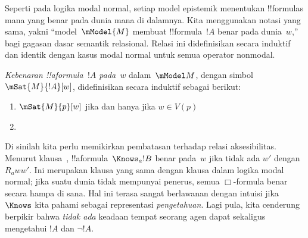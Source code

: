 \documentclass[../../../include/open-logic-section]{subfiles}
\begin{document}


Seperti pada logika modal normal, setiap model epistemik menentukan
!!{formula}s mana yang benar pada dunia mana di dalamnya. Kita menggunakan
notasi yang sama, yakni ``model~$\mModel{M}$ membuat !!{formula}~$!A$ benar
pada dunia~$w$,'' bagi gagasan dasar semantik relasional. Relasi ini
didefinisikan secara induktif dan identik dengan kasus modal normal untuk
semua operator nonmodal.

\begin{defn}
  \emph{Kebenaran !!a{formula}~$!A$ pada~$w$} dalam~$\mModel M$, dengan
  simbol $\mSat{M}{!A}[w]$, didefinisikan secara induktif sebagai berikut:
  \begin{enumerate}
  \item $\mSat{M}{p}[w]$ jika dan hanya jika $w\in V(p)$
  \item{}
  \end{enumerate}
\end{defn}

Di sinilah kita perlu memikirkan pembatasan terhadap relasi aksesibilitas.
Menurut klausa~, !!a{formula}~$\Knows_a !B$ benar
pada~$w$ jika tidak ada $w'$ dengan $R_a ww'$. Ini merupakan klausa yang sama
dengan klausa dalam logika modal normal; jika suatu dunia tidak mempunyai
penerus, semua $\Box$-formula benar secara hampa di sana. Hal ini terasa
sangat berlawanan dengan intuisi jika $\Knows$ kita pahami sebagai
representasi \emph{pengetahuan}. Lagi pula, kita cenderung berpikir bahwa
\emph{tidak ada} keadaan tempat seorang agen dapat sekaligus mengetahui $!A$
dan $\lnot !A$.
\end{document}
